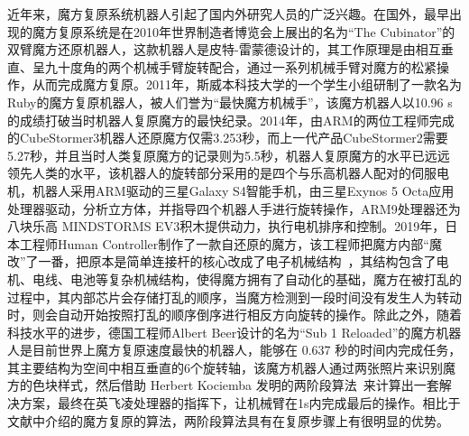 近年来，魔方复原系统机器人引起了国内外研究人员的广泛兴趣。在国外，最早出现的魔方复原系统是在2010年世界制造者博览会上展出的名为“The Cubinator”的双臂魔方还原机器人，这款机器人是皮特-雷蒙德设计的，其工作原理是由相互垂直、呈九十度角的两个机械手臂旋转配合，通过一系列机械手臂对魔方的松紧操作，从而完成魔方复原。2011年，斯威本科技大学的一个学生小组研制了一款名为Ruby的魔方复原机器人，被人们誉为“最快魔方机械手”，该魔方机器人以10.96 s的成绩打破当时机器人复原魔方的最快纪录。2014年，由ARM的两位工程师完成的CubeStormer3机器人还原魔方仅需3.253秒，而上一代产品CubeStormer2需要5.27秒，并且当时人类复原魔方的记录则为5.5秒，机器人复原魔方的水平已远远领先人类的水平，该机器人的旋转部分采用的是四个与乐高机器人配对的伺服电机，机器人采用ARM驱动的三星Galaxy S4智能手机，由三星Exynos 5 Octa应用处理器驱动，分析立方体，并指导四个机器人手进行旋转操作，ARM9处理器还为八块乐高 MINDSTORMS EV3积木提供动力，执行电机排序和控制。2019年，日本工程师Human Controller制作了一款自还原的魔方，该工程师把魔方内部“魔改”了一番，把原本是简单连接杆的核心改成了电子机械结构~\cite{7}，其结构包含了电机、电线、电池等复杂机械结构，使得魔方拥有了自动化的基础，魔方在被打乱的过程中，其内部芯片会存储打乱的顺序，当魔方检测到一段时间没有发生人为转动时，则会自动开始按照打乱的顺序倒序进行相反方向旋转的操作。除此之外，随着科技水平的进步，德国工程师Albert Beer设计的名为“Sub 1 Reloaded”的魔方机器人是目前世界上魔方复原速度最快的机器人，能够在 0.637 秒的时间内完成任务，其主要结构为空间中相互垂直的6个旋转轴，该魔方机器人通过两张照片来识别魔方的色块样式，然后借助 Herbert Kociemba 发明的两阶段算法~\cite{8}来计算出一套解决方案，最终在英飞凌处理器的指挥下，让机械臂在1s内完成最后的操作。相比于文献中介绍的魔方复原的算法，两阶段算法具有在复原步骤上有很明显的优势。

